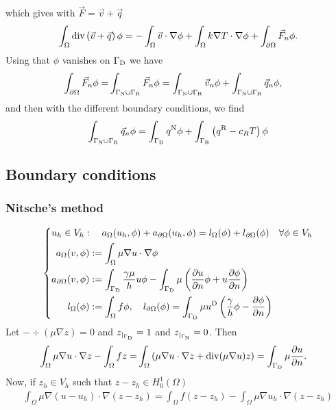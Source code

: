 %
which gives with $\vec{F}=\vec{v} + \vec{q}$%
\begin{align*}
\int_{\Omega} \operatorname{div}\left(\vec{v} + \vec{q}\right)\phi = -\int_{\Omega}\vec{v}\cdot\nabla\phi
+ \int_{\Omega}k\nabla T\cdot\nabla\phi+ \int_{\partial\Omega} \vec{F}_n\phi.
\end{align*}
%
Using that $\phi$ vanishes on $\Gamma_{\rm D}$ we have
%
\begin{align*}
\int_{\partial\Omega} \vec{F}_n\phi =& \int_{\Gamma_{\rm N}\cup\Gamma_{\rm R}} \vec{F}_n\phi
= \int_{\Gamma_{\rm N}\cup\Gamma_{\rm R}} \vec{v}_n\phi + \int_{\Gamma_{\rm N}\cup\Gamma_{\rm R}} \vec{q}_n\phi,
\end{align*}
%
and then with the different boundary conditions, we find
%
\begin{align*}
\int_{\Gamma_{\rm N}\cup\Gamma_{\rm R}} \vec{q}_n\phi = \int_{\Gamma_{\rm D}} q^{\rm N}\phi + \int_{\Gamma_{\rm R}}\left(q^{\rm R} - c_R T\right)\phi
\end{align*}
%
%
\subsection{Boundary conditions}\label{subsec:}
%
%
\subsubsection{Nitsche's method}
%
%
\begin{equation}\label{eq:laplace:weakform}
%
\left\{
\begin{aligned}
&u_h\in V_h:\quad a_{\Omega}(u_h, \phi) + a_{\partial\Omega}(u_h,\phi) = l_{\Omega}(\phi)+l_{\partial\Omega}(\phi) \quad\forall \phi\in V_h\\
&\begin{aligned}
a_{\Omega}(v,\phi) &:= \int_{\Omega} \mu \nabla u\cdot\nabla\phi \\
 a_{\partial\Omega}(v,\phi) &:= \int_{\GammaD}\frac{\gamma\mu}{h}u\phi - 
 \int_{\GammaD}\mu \left(  \dn{u} \phi + u  \dn{\phi}\right) \\
 l_{\Omega}(\phi) &:= \int_{\Omega} f\phi, \quad
 l_{\partial\Omega}(\phi) = \int_{\GammaD}\mu\uD\left( \frac{\gamma}{h}\phi - \dn{\phi}\right)
\end{aligned}
\end{aligned}
\right.
%
\end{equation}
%
Let $-\div(\mu \nabla z)= 0$ and ${z}_{|_{\Gamma_{\rm D}}}=1$ and ${z}_{|_{\Gamma_{\rm N}}}=0$. Then
%
\begin{align*}
\int_{\Omega} \mu \nabla u\cdot\nabla z -\int_{\Omega} fz =&  \int_{\Omega} \left( \mu \nabla u\cdot\nabla z + \operatorname{div}(\mu \nabla u)z\right) 
= \int_{\Gamma_{\rm D}}\mu\frac{\partial u}{\partial n}.
\end{align*}
%
Now, if $z_h\in V_h$ such that $z-z_h\in H^1_0(\Omega)$ 
%
\begin{align*}
\int_{\Omega} \mu \nabla (u-u_h)\cdot\nabla(z-z_h) = \int_{\Omega} f(z-z_h) -\int_{\Omega} \mu \nabla u_h\cdot\nabla(z-z_h)
\end{align*}
%

